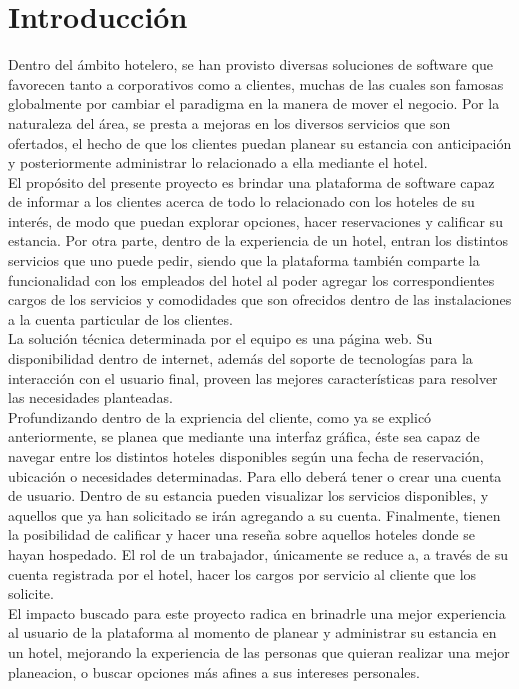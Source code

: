 \section{\bfseries\LARGE Introducción}

Dentro del ámbito hotelero, se han provisto diversas soluciones de software que favorecen tanto a corporativos como a clientes, muchas de las cuales son famosas globalmente por cambiar el paradigma en la manera de mover el negocio. Por la naturaleza del área, se presta a mejoras en los diversos servicios que son ofertados, el hecho de que los clientes puedan planear su estancia con anticipación y posteriormente administrar lo relacionado a ella mediante el hotel.\\

El propósito del presente proyecto es brindar una plataforma de software capaz de informar a los clientes acerca de todo lo relacionado con los hoteles de su interés, de modo que puedan explorar opciones, hacer reservaciones y calificar su estancia. Por otra parte, dentro de la experiencia de un hotel, entran los distintos servicios que uno puede pedir, siendo que la plataforma también comparte la funcionalidad con los empleados del hotel al poder agregar los correspondientes cargos de los servicios y comodidades que son ofrecidos dentro de las instalaciones a la cuenta particular de los clientes.\\

La solución técnica determinada por el equipo es una página web. Su disponibilidad dentro de internet, además del soporte de tecnologías para la interacción con el usuario final, proveen las mejores características para resolver las necesidades planteadas.\\

Profundizando dentro de la expriencia del cliente, como ya se explicó anteriormente, se planea que mediante una interfaz gráfica, éste sea capaz de navegar entre los distintos hoteles disponibles según una fecha de reservación, ubicación o necesidades determinadas. Para ello deberá tener o crear una cuenta de usuario. Dentro de su estancia pueden visualizar los servicios disponibles, y aquellos que ya han solicitado se irán agregando a su cuenta. Finalmente, tienen la posibilidad de calificar y hacer una reseña sobre aquellos hoteles donde se hayan hospedado. El rol de un trabajador, únicamente se reduce a, a través de su cuenta registrada por el hotel, hacer los cargos por servicio al cliente que los solicite. \\

El impacto buscado para este proyecto radica en brinadrle una mejor experiencia al usuario de la plataforma al momento de planear y administrar su estancia en un hotel, mejorando la experiencia de las personas que quieran realizar una mejor planeacion, o buscar opciones más afines a sus intereses personales.